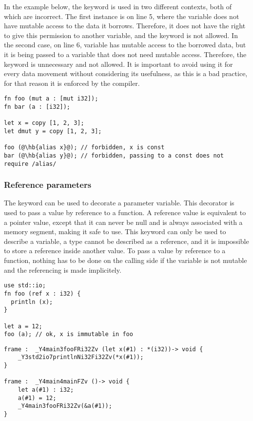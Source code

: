 In the example below, the keyword  is used in two different
contexts, both of which are incorrect. The first instance is on line 5, where
the variable  does not have mutable access to the data it borrows.
Therefore, it does not have the right to give this permission to another
variable, and the keyword  is not allowed. In the second case, on
line 6, variable  has mutable access to the borrowed data, but it is
being passed to a variable that does not need mutable access. Therefore, the
keyword is unnecessary and not allowed. It is important to avoid using it for
every data movement without considering its usefulness, as this is a bad
practice, for that reason it is enforced by the compiler.

\begin{lstlisting}[style=coloredverbatim, escapechar=@]
fn foo (mut a : [mut i32]);
fn bar (a : [i32]);

let x = copy [1, 2, 3];
let dmut y = copy [1, 2, 3];

foo (@\hb{alias x}@); // forbidden, x is const
bar (@\hb{alias y}@); // forbidden, passing to a const does not require /alias/
\end{lstlisting}

\subsubsection {Reference parameters}
\label{sec:ref_param}


The  keyword can be used to decorate a parameter variable. This
decorator is used to pass a value by reference to a function. A reference value
is equivalent to a pointer value, except that it can never be null and is always
associated with a memory segment, making it safe to use. This keyword can only
be used to describe a variable, a type cannot be described as a reference, and
it is impossible to store a reference inside another value. To pass a value by
reference to a function, nothing has to be done on the calling side if the
variable is not mutable and the referencing is made implicitely.

\begin{lstlisting}[style=coloredverbatim]
use std::io;
fn foo (ref x : i32) {
  println (x);
}

let a = 12;
foo (a); // ok, x is immutable in foo
\end{lstlisting}

\begin{lstlisting}[style=intermediateVerb]
frame :  _Y4main3fooFRi32Zv (let x(#1) : *(i32))-> void {
    _Y3std2io7printlnNi32Fi32Zv(*x(#1));
}

frame :  _Y4main4mainFZv ()-> void {
    let a(#1) : i32;
    a(#1) = 12;
    _Y4main3fooFRi32Zv(&a(#1));
}
\end{lstlisting}

